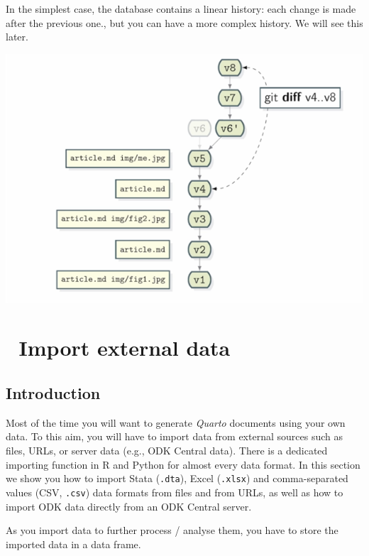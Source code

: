 \documentclass[
  letterpaper,
  DIV=11,
  numbers=noendperiod,
  oneside]{scrreprt}
\begin{document}
In the simplest case, the database contains a linear history: each
change is made after the previous one., but you can have a more complex
history. We will see this later.

\includegraphics{images/paste-48384992.png}

\hypertarget{import-external-data}{%
\chapter{\texorpdfstring{{📘} Import external
data}{📘 Import external data}}\label{import-external-data}}

\hypertarget{introduction-7}{%
\section{Introduction}\label{introduction-7}}

Most of the time you will want to generate \emph{Quarto} documents using
your own data. To this aim, you will have to import data from external
sources such as files, URLs, or server data (e.g., ODK Central data).
There is a dedicated importing function in R and Python for almost every
data format. In this section we show you how to import Stata
(\texttt{.dta}), Excel (\texttt{.xlsx}) and comma-separated values (CSV,
\texttt{.csv}) data formats from files and from URLs, as well as how to
import ODK data directly from an ODK Central server.

\begin{tcolorbox}[enhanced jigsaw, coltitle=black, opacityback=0, title=\textcolor{quarto-callout-important-color}{\faExclamation}\hspace{0.5em}{Important}, toprule=.15mm, bottomtitle=1mm, colbacktitle=quarto-callout-important-color!10!white, colframe=quarto-callout-important-color-frame, left=2mm, opacitybacktitle=0.6, bottomrule=.15mm, arc=.35mm, toptitle=1mm, colback=white, titlerule=0mm, breakable, leftrule=.75mm, rightrule=.15mm]

As you import data to further process / analyse them, you have to store
the imported data in a data frame.

\end{tcolorbox}
\end{document}
